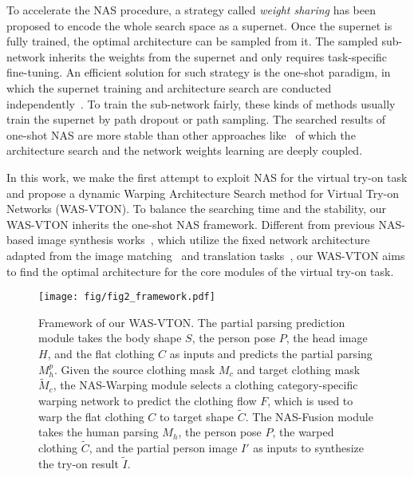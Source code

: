 \documentclass[sigconf]{acmart}
\begin{document}
To accelerate the NAS procedure, a strategy called \textit{weight sharing} has been proposed to encode the whole search space as a supernet. Once the supernet is fully trained, the optimal architecture can be sampled from it. The sampled sub-network inherits the weights from the supernet and only requires task-specific fine-tuning.
An efficient solution for such strategy is the one-shot paradigm, in which the supernet training and architecture search are conducted independently~\cite{bender2018oneshot,zichao2019singlepath,li2020dna}. To train the sub-network fairly, these kinds of methods usually train the supernet by path dropout or path sampling. 
The searched results of one-shot NAS are more stable than other approaches like~\cite{liu2018dasrts,xu2019pc-darts,gao2019adversarialnas,lahner2018deepwrinkles} of which the 
architecture search and the network weights learning are deeply coupled. 

In this work, we make the first attempt to exploit NAS for the virtual try-on task and propose a dynamic Warping Architecture Search method for Virtual Try-on Networks (WAS-VTON). To balance the searching time and the stability, our WAS-VTON inherits the one-shot NAS framework. Different from previous NAS-based image synthesis works~\cite{gao2019adversarialnas,gong2019autogan}, which utilize the fixed network architecture adapted from the image matching~\cite{cnngeometric} and translation tasks~\cite{pix2pix2017}, our WAS-VTON aims to find the optimal architecture for the core modules of the virtual try-on task.

\begin{figure*}[t]
  \centering
  \texttt{[image: fig/fig2\_framework.pdf]}
  \vspace{-4mm}
  \caption{Framework of our WAS-VTON. The partial parsing prediction module takes the body shape $S$, the person pose $P$, the head image $H$, and the flat clothing $C$ as inputs and predicts the partial parsing $M_h^p$. Given the source clothing mask $M_c$ and target clothing mask $\tilde{M}_c$, the NAS-Warping module selects a clothing category-specific warping network to predict the clothing flow $F$, which is used to warp the flat clothing $C$ to target shape $\tilde{C}$. The NAS-Fusion module takes the human parsing $M_h$, the person pose $P$, the warped clothing $\tilde{C}$, and the partial person image $I'$ as inputs to synthesize the try-on result $\tilde{I}$.}
  \vspace{-3mm}
  \label{fig:framework}
\end{figure*}
\end{document}
